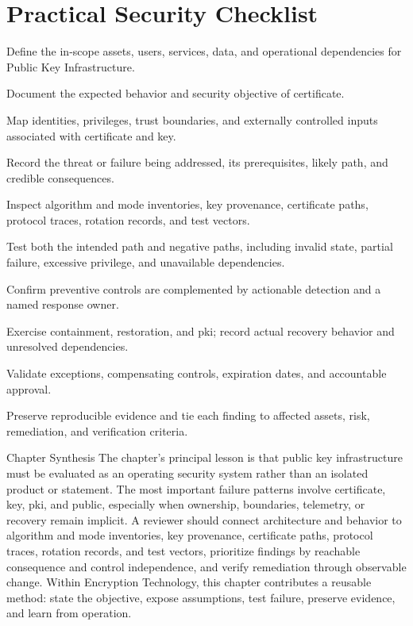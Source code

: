 \documentclass[11pt,letterpaper]{article}
\begin{document}
\section*{Practical Security Checklist}
\begin{CornellChecklist}
\item Define the in-scope assets, users, services, data, and operational dependencies for Public Key Infrastructure.
\item Document the expected behavior and security objective of certificate.
\item Map identities, privileges, trust boundaries, and externally controlled inputs associated with certificate and key.
\item Record the threat or failure being addressed, its prerequisites, likely path, and credible consequences.
\item Inspect algorithm and mode inventories, key provenance, certificate paths, protocol traces, rotation records, and test vectors.
\item Test both the intended path and negative paths, including invalid state, partial failure, excessive privilege, and unavailable dependencies.
\item Confirm preventive controls are complemented by actionable detection and a named response owner.
\item Exercise containment, restoration, and pki; record actual recovery behavior and unresolved dependencies.
\item Validate exceptions, compensating controls, expiration dates, and accountable approval.
\item Preserve reproducible evidence and tie each finding to affected assets, risk, remediation, and verification criteria.
\end{CornellChecklist}
\begin{CornellSummaryBox}{Chapter Synthesis}
The chapter's principal lesson is that public key infrastructure must be evaluated as an operating security system rather than an isolated product or statement. The most important failure patterns involve certificate, key, pki, and public, especially when ownership, boundaries, telemetry, or recovery remain implicit. A reviewer should connect architecture and behavior to algorithm and mode inventories, key provenance, certificate paths, protocol traces, rotation records, and test vectors, prioritize findings by reachable consequence and control independence, and verify remediation through observable change. Within Encryption Technology, this chapter contributes a reusable method: state the objective, expose assumptions, test failure, preserve evidence, and learn from operation.
\end{CornellSummaryBox}
\end{document}
